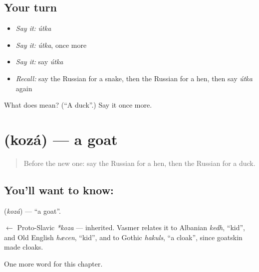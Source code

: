 \subsection*{Your turn}
\begin{itemize}
\raggedright
  \item \emph{Say it:} \emph{útka}
  \item \emph{Say it:} \emph{útka}, once more
  \item \emph{Say it:} say \emph{útka}
  \item \emph{Recall:} say the Russian for a snake, then the Russian for a hen, then say \emph{útka} again
\end{itemize}

\begin{tcolorbox}[breakable,colback=teal!4,colframe=teal!35!black,title={Before you move on}]
What does  mean? (\textquotedblleft{}A duck\textquotedblright{}.) Say it once more.
\end{tcolorbox}
\section[\texorpdfstring{\ru{коза} (kozá)}{коза (kozá)}]{ (kozá) — a goat}

\label{lesson:RU-C62-goat}



\begin{quote}
Before the new one: say the Russian for a hen, then the Russian for a duck.
\end{quote}

\subsection*{You'll want to know: }
\textbf{} (\emph{kozá}) — \textquotedblleft{}a goat\textquotedblright{}.

\begin{cousinweb}
\textbf{} $\leftarrow$ Proto-Slavic \emph{*koza} — inherited. Vasmer relates it to Albanian \emph{kedh}, \textquotedblleft{}kid\textquotedblright{}, and Old English \emph{hæcen}, \textquotedblleft{}kid\textquotedblright{}, and to Gothic \emph{hakuls}, \textquotedblleft{}a cloak\textquotedblright{}, since goatskin made cloaks.
\end{cousinweb}

\begin{grammarlens}[title={What you've built}]
One more word for this chapter.
\end{grammarlens}


